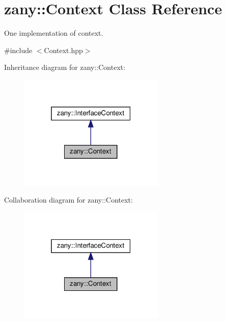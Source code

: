 \hypertarget{classzany_1_1_context}{}\section{zany\+:\+:Context Class Reference}
\label{classzany_1_1_context}


One implementation of context.  




{\ttfamily \#include $<$Context.\+hpp$>$}



Inheritance diagram for zany\+:\+:Context\+:\nopagebreak
\begin{figure}[H]
\begin{center}
\leavevmode
\includegraphics[width=196pt]{classzany_1_1_context__inherit__graph}
\end{center}
\end{figure}


Collaboration diagram for zany\+:\+:Context\+:\nopagebreak
\begin{figure}[H]
\begin{center}
\leavevmode
\includegraphics[width=196pt]{classzany_1_1_context__coll__graph}
\end{center}
\end{figure}
